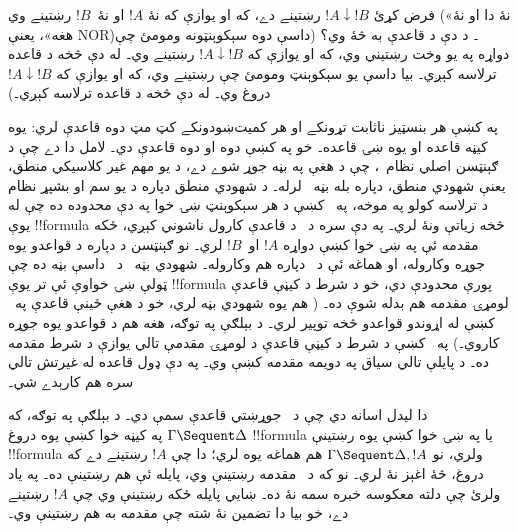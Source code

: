 \documentclass[../../../include/open-logic-section]{subfiles}
\begin{document}
\begin{prob}
فرض کړئ $!A \downarrow !B$ رښتينے دے، که او يوازې که نۀ
$!A$ او نۀ~$!B$ رښتينے وي («نۀ دا او نۀ هغه»، يعنې NOR)۔
د دې د  قاعدې به څۀ وي؟ (داسې دوه سېکوېنټونه ومومئ
چې دواړه په يو وخت رښتيني وي، که او يوازې که $!A \downarrow !B$
رښتينے وي۔ له دې څخه د \RightR{\downarrow} قاعده ترلاسه کېږي۔
بيا داسې يو سېکوېنټ ومومئ چې رښتينے وي، که او يوازې که
$!A \downarrow !B$ دروغ وي۔ له دې څخه د \LeftR{\downarrow}
قاعده ترلاسه کېږي۔)
\end{prob}

په  کښې هر بنسټيز ناثابت تړونکے او هر کميت‌ښودونکے کټ مټ دوه قاعدې
لري: يوه کيڼه قاعده او يوه ښۍ قاعده۔ خو په  کښې
دوه \LeftR{\land} او دوه \RightR{\lor} قاعدې دي۔ لامل دا دے
چې د ګېنټسن اصلي نظام~، چې  د هغې په بڼه
جوړ شوے دے، د يو مهم غير کلاسيکي منطق، يعنې شهودي منطق،
دپاره بله بڼه~ لرله۔ د شهودي منطق دپاره د يو سم او
بشپړ نظام د ترلاسه کولو په موخه، په~ کښې د هر
سېکوېنټ ښۍ خوا په دې محدوده ده چې له يوې !!{formula} څخه
زياتې ونۀ لري۔ په دې سره د~ د \RightR{\lor} قاعدې
کارول ناشوني کېږي، ځکه مقدمه ئې په ښۍ خوا کښې دواړه $!A$
او~$!B$ لري۔ نو ګېنټسن د  دپاره د \RightR{\lor}
قواعدو يوه جوړه وکاروله، او هماغه ئې د~ دپاره هم
وکاروله۔ شهودي بڼه~ د~ داسې بڼه ده
چې ټولې ښۍ خواوې ئې تر يوې !!{formula} پورې محدودې دي،
خو د شرط د کيڼې قاعدې لومړۍ مقدمه هم بدله شوې ده۔
( هم يوه شهودي بڼه لري، خو د هغې ځينې قاعدې
په~ کښې له اړوندو قواعدو څخه توپير لري۔ د بېلګې
په توګه، هغه هم د \RightR{\lor} قواعدو يوه جوړه کاروي۔)
په~ کښې د شرط د کيڼې قاعدې د لومړۍ مقدمې
تالي يوازې د شرط مقدمه ده۔ د پايلې تالي سياق په دويمه مقدمه کښې وي۔
په دې ډول قاعده له غيرتش تالي سره هم کارېدے شي۔

دا ليدل اسانه دي چې د~ جوړښتي قاعدې سمې دي۔
د بېلګې په توګه، که $\Gamma \Sequent \Delta$ په کيڼه خوا کښې
يوه دروغ !!{formula} يا په ښۍ خوا کښې يوه رښتينې !!{formula}
ولري، نو $\Gamma \Sequent
\Delta, !A$ هم هماغه يوه لري؛ دا چې $!A$ رښتينے دے که دروغ،
څۀ اغېز نۀ لري۔ نو که د~\RightR{\Weakening} مقدمه رښتينې وي،
پايله ئې هم رښتينې ده۔ په ياد ولرئ چې دلته معکوسه خبره سمه
نۀ ده۔ ښايي پايله ځکه رښتينې وي چې $!A$ رښتينے دے، خو بيا
دا تضمين نۀ شته چې مقدمه به هم رښتينې وي۔
\end{document}
